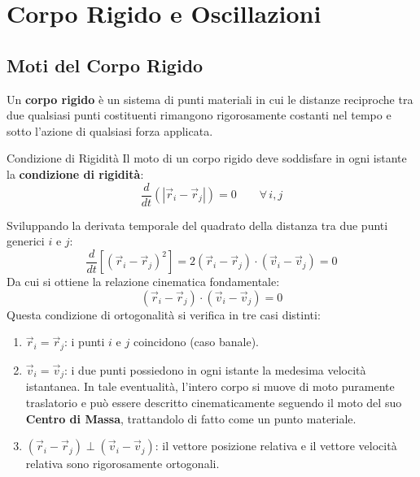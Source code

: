 \chapter{Corpo Rigido e Oscillazioni}


\section{Moti del Corpo Rigido}

Un \textbf{corpo rigido} è un sistema di punti materiali in cui le distanze reciproche tra due qualsiasi punti costituenti rimangono rigorosamente costanti nel tempo e sotto l'azione di qualsiasi forza applicata.

\begin{definizione}{Condizione di Rigidità}
Il moto di un corpo rigido deve soddisfare in ogni istante la \textbf{condizione di rigidità}:
\begin{equation}
    \frac{d}{dt} \left( |\vec{r}_i - \vec{r}_j| \right) = 0 \qquad \forall \, i, j
\end{equation}
\end{definizione}

Sviluppando la derivata temporale del quadrato della distanza tra due punti generici $i$ e $j$:
\begin{equation}
    \frac{d}{dt} \left[ (\vec{r}_i - \vec{r}_j)^2 \right] = 2(\vec{r}_i - \vec{r}_j) \cdot (\vec{v}_i - \vec{v}_j) = 0
\end{equation}
Da cui si ottiene la relazione cinematica fondamentale:
\begin{equation}
    (\vec{r}_i - \vec{r}_j) \cdot (\vec{v}_i - \vec{v}_j) = 0
\end{equation}
Questa condizione di ortogonalità si verifica in tre casi distinti:
\begin{enumerate}
    \item $\vec{r}_i = \vec{r}_j$: i punti $i$ e $j$ coincidono (caso banale).
    \item $\vec{v}_i = \vec{v}_j$: i due punti possiedono in ogni istante la medesima velocità istantanea. In tale eventualità, l'intero corpo si muove di moto puramente traslatorio e può essere descritto cinematicamente seguendo il moto del suo \textbf{Centro di Massa}, trattandolo di fatto come un punto materiale.
    \item $(\vec{r}_i - \vec{r}_j) \perp (\vec{v}_i - \vec{v}_j)$: il vettore posizione relativa e il vettore velocità relativa sono rigorosamente ortogonali.
\end{enumerate}

